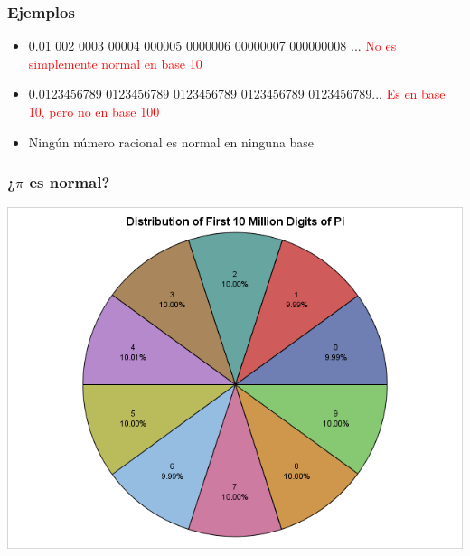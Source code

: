 \begin{frame}
\frametitle{Ejemplos}
\medskip
\begin{itemize}
	\item 0.01 002 0003 00004 000005 0000006 00000007 000000008 ... \textcolor{red}{No es simplemente normal en base 10}
	\pause
	\item 0.0123456789 0123456789 0123456789 0123456789 0123456789... \textcolor{red}{Es en base 10, pero no en base 100}
	\pause
	\item Ningún número racional es normal en ninguna base
\end{itemize}
\end{frame}

\begin{frame}
\frametitle{¿$\pi$ es normal?}
\begin{center}
\includegraphics[scale=0.6]{imagenes/digitsofpi.png}
\end{center}
\pause
{}
\end{frame}

